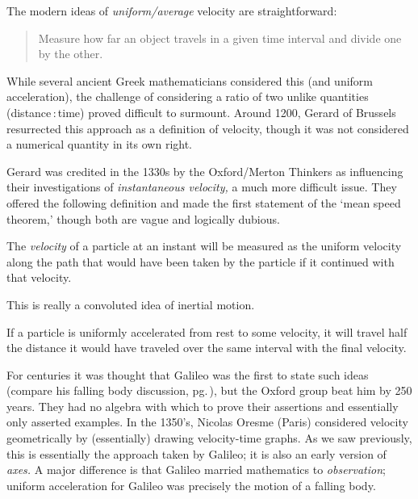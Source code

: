 
The modern ideas of \emph{uniform/average} velocity are straightforward:
\begin{quote}
Measure how far an object travels in a given time interval and divide one by the other.
\end{quote}
While several ancient Greek mathematicians %
considered this (and uniform acceleration), the challenge of considering a ratio of two unlike quantities (distance\,:\,time) proved difficult to surmount. Around 1200, Gerard of Brussels resurrected this approach as a definition of velocity, though it was not  considered a numerical quantity in its own right.\smallbreak

Gerard was credited in the 1330s by the Oxford/Merton Thinkers %
as influencing their investigations of \emph{instantaneous velocity,} a much more difficult issue. They offered the following definition and made the first statement of the `mean speed theorem,' though both are vague and logically dubious.

\begin{defn*}{}{}
The \emph{velocity} of a particle at an instant will be measured as the uniform velocity along the path that would have been taken by the particle if it continued with that velocity.
\end{defn*}

This is really a convoluted idea of inertial motion.

\begin{thm*}{}{}
If a particle is uniformly accelerated from rest to some velocity, it will travel half the distance it would have traveled over the same interval with the final velocity.
\end{thm*}

For centuries it was thought that Galileo was the first to state such ideas (compare his falling body discussion, pg.\,\pageref{pg:galileo}), but the Oxford group beat him by 250 years. They had no algebra with which to prove their assertions and essentially only asserted examples. %
\smallbreak
In the 1350's, Nicolas Oresme (Paris) considered velocity geometrically by (essentially) drawing velocity-time graphs. As we saw previously, this is essentially the approach taken by Galileo; it is also an early version of \emph{axes.} A major difference is that Galileo married mathematics to \emph{observation}; uniform acceleration for Galileo was precisely the motion of a falling body.
\smallbreak


